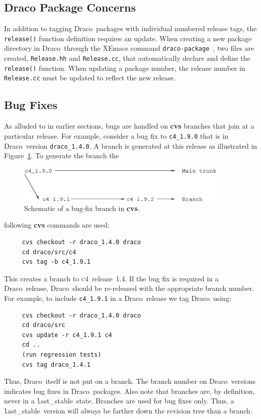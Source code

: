 \documentclass[11pt]{nmemo}
\newcommand{\draco}{{\normalfont\normalsize\textsf Draco}}
\newcommand{\cfour}{{\normalfont\normalsize\scshape c\small 4}}
\newcommand{\stable}{{\normalfont\normalsize\texttt last\_stable}}
\begin{document}
\subsection{Draco Package Concerns}

In addition to tagging \draco\ packages with individual numbered
release tags, the \texttt{release()} function definition requires an
update.  When creating a new package directory in \draco\ through the
XEmacs command \texttt{draco-package}~\cite{xtm:9909}, two files are
created, \texttt{Release.hh} and \texttt{Release.cc}, that
automatically declare and define the \texttt{release()} function.
When updating a package number, the release number in
\texttt{Release.cc} must be updated to reflect the new release.

\subsection{Bug Fixes}

As alluded to in earlier sections, bugs are handled on {\bf cvs}
branches that join at a particular release.  For example, consider a
bug fix to \texttt{c4\_1.9.0} that is in \draco\ version
\texttt{draco\_1.4.0}.  A branch is generated at this release as
illustrated in Figure~\ref{fig:branch}.  To generate the branch the
\begin{figure}
  \centerline{\includegraphics[width=4in]{branch.eps}}
  \caption{Schematic of a bug-fix branch in {\bf cvs}.}
  \label{fig:branch}
\end{figure}
following {\bf cvs} commands are used:
\begin{verbatim}
     cvs checkout -r draco_1.4.0 draco
     cd draco/src/c4
     cvs tag -b c4_1.9.1
\end{verbatim}
This creates a branch to \cfour\ release~1.4.  If the bug fix is
required in a \draco\ release, \draco\ should be re-released with the
appropriate branch number.  For example, to include \texttt{c4\_1.9.1}
in a \draco\ release we tag \draco\ using:
\begin{verbatim}
     cvs checkout -r draco_1.4.0 draco
     cd draco/src
     cvs update -r c4_1.9.1 c4
     cd ..
     (run regression tests)
     cvs tag draco_1.4.1
\end{verbatim}
Thus, \draco\ itself is not put on a branch.  The branch number on
\draco\ versions indicates bug fixes in \draco\ packages.  Also note
that branches are, by definition, never in a \stable\ state.  Branches
are used for bug fixes only.  Thus, a \stable\ version will always be
farther down the revision tree than a branch.
\end{document}
